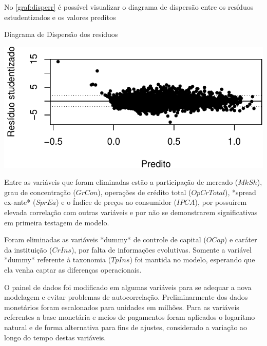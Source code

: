 \documentclass[
  12pt,
  12pt,
  openright,
  oneside,
  a4paper,
  chapter=TITLE,
  section=TITLE,
  subsection=TITLE,
  subsubsection=TITLE,
  english,
  portugues,
  sumario=tradicional]{abntex2}
\begin{document}
\begin{apendicesenv}
No \autoref{graf:disperr} é possível visualizar o diagrama de dispersão entre os resíduos estudentizados e os valores preditos




\begin{grafico}[!hbtp]
\caption{Diagrama de Dispersão dos resíduos}
\vspace{-4mm}

\begin{center}\includegraphics{12-exportedfigures/erros.disp-1} \end{center}
\vspace{3mm}
\label{graf:disperr}
\vspace{-2mm}
\end{grafico}











Entre as variáveis que foram eliminadas estão a participação de mercado ($MkSh$), grau de concentração ($GrCon$), operações de crédito total ($OpCrTotal$), *spread ex-ante* ($SprEa$) e o Índice de preços ao consumidor ($IPCA$), por possuírem elevada correlação com outras variáveis e por não se demonstrarem significativas em primeira testagem de modelo. 

Foram eliminadas as variáveis *dummy* de controle de capital ($OCap$) e caráter da instituição ($CrIns$), por falta de informações evolutivas. Somente a variável *dummy*  referente à taxonomia ($TpIns$) foi mantida no modelo, esperando que ela venha captar as diferenças operacionais.

O painel de dados foi modificado em algumas variáveis para se adequar a nova modelagem e evitar problemas de autocorrelação. Preliminarmente dos dados monetários foram escalonados para unidades em milhões. Para as variáveis referentes a base monetária e meios de pagamentos foram aplicados o logarítmo natural e de forma alternativa para fins de ajustes, considerado a variação ao longo do tempo destas variáveis.   


\end{apendicesenv}
\end{document}
